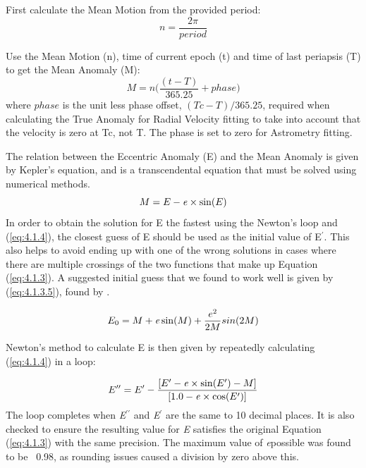 \documentclass[12pt,preprint]{aastex}
\begin{document}
First calculate the Mean Motion from the provided period:
\begin{equation}\label{eq:4.1.1}
n = \frac{2\pi}{period} 
\end{equation}

Use the Mean Motion (n), time of current epoch (t) and time of last periapsis (T) to get the Mean Anomaly (M):
\begin{equation}\label{eq:4.1.2}
M = n \bigg( \frac{(t-T)}{365.25} + phase\bigg)
\end{equation}
where $phase$ is the unit less phase offset, $(Tc-T)/365.25$, required when calculating the True Anomaly for Radial Velocity fitting to take into account that the velocity is zero at Tc, not T.  The phase is set to zero for Astrometry fitting.

The relation between the Eccentric Anomaly (E) and the Mean Anomaly is given by Kepler's equation, and is a transcendental equation that must be solved using numerical methods.
\begin{equation}\label{eq:4.1.3}
M = E - {\it e}\times\sin(E)
\end{equation}
In order to obtain the solution for E the fastest using the Newton's loop and (\ref{eq:4.1.4}), the closest guess of E should be used as the initial value of E$^{\prime}$.  This also helps to avoid ending up with one of the wrong solutions in cases where there are multiple crossings of the two functions that make up Equation (\ref{eq:4.1.3}).  A suggested initial guess that we found to work well is given by (\ref{eq:4.1.3.5}), found by \citep{Argyle}.

\begin{equation}\label{eq:4.1.3.5}
E_0 = M+{\it e}\sin(M) + \frac{e^2}{2M}sin(2M)
\end{equation}

Newton's method to calculate E is then given by repeatedly calculating (\ref{eq:4.1.4}) in a loop:
  
\begin{equation}\label{eq:4.1.4}
E^{\prime \prime} = E^{\prime} - \frac{[E^{\prime} - {\it e} \times \sin(E^{\prime}) - M]}{[1.0 - {\it e} \times \cos(E^{\prime})]}
\end{equation}
The loop completes when {\it E$^{\prime \prime}$} and {\it E$^{\prime}$} are the same to 10 decimal places.  It is also checked to ensure the resulting value for {\it E} satisfies the original Equation (\ref{eq:4.1.3}) with the same precision.  The maximum value of {\it e}possible was found to be ~0.98, as rounding issues caused a division by zero above this.\\
\end{document}
